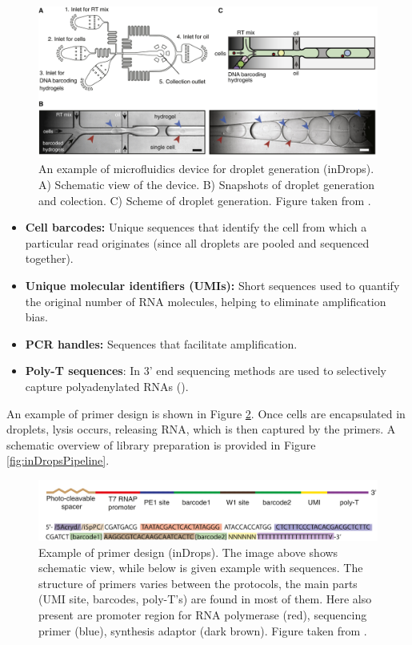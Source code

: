 \begin{figure}
  \centering
  \includegraphics[width=\linewidth]{images/indropsDevice.jpg}
  \caption{An example of microfluidics device for droplet generation (inDrops).
  A) Schematic view of the device.
  B) Snapshots of droplet generation and colection.
  C) Scheme of droplet generation.
  Figure taken from \textcite{Klein2015}.}
  \label{fig:inDropsDevice}
\end{figure}

\begin{itemize}
  \item \textbf{Cell barcodes:} Unique sequences that identify the cell from which a particular read originates (since all droplets are pooled and sequenced together).
  \item \textbf{Unique molecular identifiers (UMIs):} Short sequences used to quantify the original number of RNA molecules, helping to eliminate amplification bias.
  \item \textbf{PCR handles:} Sequences that facilitate amplification.
  \item \textbf{Poly-T sequences}: In 3' end sequencing methods are used to selectively capture polyadenylated RNAs (\cite{Zhang2019}).
\end{itemize}
An example of primer design is shown in Figure \ref{fig:inDropsPrimer}.
Once cells are encapsulated in droplets, lysis occurs, releasing RNA, which is then captured by the primers.
A schematic overview of library preparation is provided in Figure \ref{fig:inDropsPipeline}.

\begin{figure}
  \centering
  \includegraphics[width=\linewidth]{images/primer.png}
  \caption{Example of primer design (inDrops).
  The image above shows schematic view, while below is given example with sequences.
  The structure of primers varies between the protocols, the main parts (UMI site, barcodes, poly-T's)
  are found in most of them.
  Here also present are promoter region for RNA polymerase (red), sequencing primer (blue), synthesis adaptor (dark brown).
  Figure taken from \textcite{Klein2015}.}
  \label{fig:inDropsPrimer}
\end{figure}

